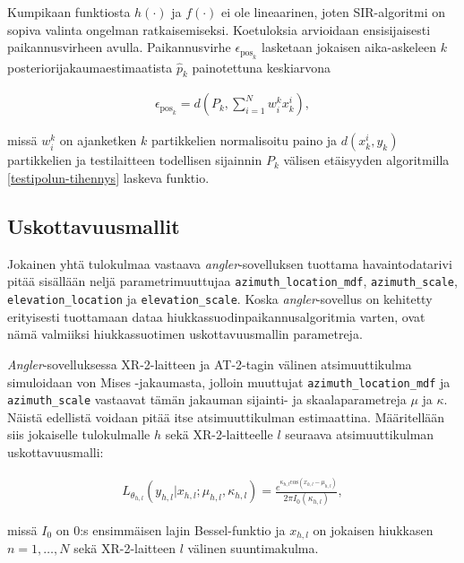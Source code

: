 \documentclass[
  12pt,
  a4paper, twoside]{book}
\begin{document}
Kumpikaan funktiosta \(h(\cdot)\) ja \(f(\cdot)\) ei ole lineaarinen, joten SIR-algoritmi on sopiva valinta ongelman ratkaisemiseksi. Koetuloksia arvioidaan ensisijaisesti paikannusvirheen avulla. Paikannusvirhe \(\epsilon_{\text{pos}_k}\) lasketaan jokaisen aika-askeleen \(k\) posteriorijakaumaestimaatista \(\hat{p}_k\) painotettuna keskiarvona

\begin{align}
\epsilon_{\text{pos}_k} = d\left( P_k, \sum_{i=1}^Nw^k_ix^i_k \right),
\end{align}

\noindent missä \(w_i^k\) on ajanketken \(k\) partikkelien normalisoitu paino ja \(d(x^i_k,y_k)\) partikkelien ja testilaitteen todellisen sijainnin \(P_k\) välisen etäisyyden algoritmilla \ref{testipolun-tihennys} laskeva funktio.

\subsection{Uskottavuusmallit}\label{uskottavuusmallit}

Jokainen yhtä tulokulmaa vastaava \emph{angler}-sovelluksen tuottama havaintodatarivi pitää sisällään neljä parametrimuuttujaa \texttt{azimuth\_location\_mdf}, \texttt{azimuth\_scale}, \texttt{elevation\_location} ja \texttt{elevation\_scale}. Koska \emph{angler}-sovellus on kehitetty erityisesti tuottamaan dataa hiukkassuodinpaikannusalgoritmia varten, ovat nämä valmiiksi hiukkassuotimen uskottavuusmallin parametreja.

\emph{Angler}-sovelluksessa XR-2-laitteen ja AT-2-tagin välinen atsimuuttikulma simuloidaan von Mises -jakaumasta, jolloin muuttujat \texttt{azimuth\_location\_mdf} ja \texttt{azimuth\_scale} vastaavat tämän jakauman sijainti- ja skaalaparametreja \(\mu\) ja \(\kappa\). Näistä edellistä voidaan pitää itse atsimuuttikulman estimaattina. Määritellään siis jokaiselle tulokulmalle \(h\) sekä XR-2-laitteelle \(l\) seuraava atsimuuttikulman uskottavuusmalli:

\begin{align}\label{atsimuutti-uskottavuusmalli}
L_{\theta_{h,l}}(y_{h,l}|x_{h,l}; \mu_{h,l}, \kappa_{h,l})=\frac{e^{\kappa_{h,l} \text{cos}(x_{h,l}-\mu_{h,l})}}{2 \pi I_0(\kappa_{h,l})},
\end{align}

\noindent missä \(I_0\) on 0:s ensimmäisen lajin Bessel-funktio ja \(x_{h,l}\) on jokaisen hiukkasen \(n=1,\ldots,N\) sekä XR-2-laitteen \(l\) välinen suuntimakulma.
\end{document}
